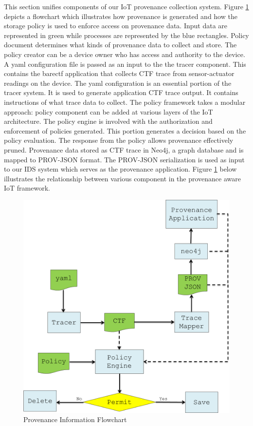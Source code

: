This section unifies components of our IoT provenance collection system. Figure \ref{flow_chart} depicts a flowchart which illustrates how provenance is generated and how the storage policy is used to enforce access on provenance data. Input data are represented in green while processes are represented by the blue rectangles. Policy document determines what kinds of provenance data to collect and store. The policy creator can be a device owner who has access and authority to the device. A yaml configuration file is passed as an input to the the tracer component. This contains the barectf application that collects CTF trace from sensor-actuator readings on the device. The yaml configuration is an essential portion of the tracer system.  It is used to generate application CTF trace output. It contains instructions of what trace data to collect. The policy framework takes a modular approach: policy component can be added at various layers of the IoT architecture. The policy engine is involved with the authorization and enforcement of policies generated. This portion generates a decision based on the policy evaluation. The response from the policy allows provenance effectively pruned. Provenance data stored as CTF trace in Neo4j, a graph database and is mapped to PROV-JSON format. The PROV-JSON serialization is used as input to our IDS system which serves as the provenance application. Figure \ref{flow_chart} below illustrates the relationship between various component in the provenance aware IoT framework.

\begin{figure}[h!]
\begin{center}

\includegraphics[width =4.5in]{policy_flowchart.PNG}    
\end{center}
\caption{Provenance Information Flowchart }
\label{flow_chart}
\end{figure}

